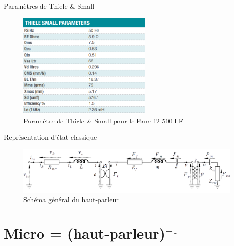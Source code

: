 \documentclass[aspectratio=169]{beamer}
\begin{document}
\begin{frame}{Paramètres de Thiele \& Small}	
	\begin{figure}[!h]
	\begin{center}
	\includegraphics[width=0.59\textwidth]{figure/thieleSmallFane12500LF.png}
	\end{center}
	\caption{Paramètre de Thiele \& Small pour le Fane 12-500 LF}
	\label{ThieleSmall}
	\end{figure}	
	
\end{frame}
\begin{frame}{Représentation d'état classique}
	\begin{figure}[!h]
	\begin{center}
	\includegraphics[width=1\textwidth]{figure/schema_general.png}
	\end{center}
	\caption{Schéma général du haut-parleur}
	\label{schema_gene}
	\end{figure}
\end{frame}




\section{Micro = (haut-parleur)$^{-1}$}
\end{document}
